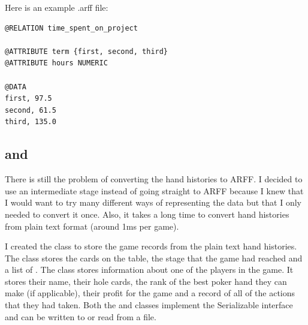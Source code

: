Here is an example .arff file:
\begin{verbatim}
@RELATION time_spent_on_project

@ATTRIBUTE term {first, second, third}
@ATTRIBUTE hours NUMERIC

@DATA
first, 97.5
second, 61.5
third, 135.0
\end{verbatim}


\subsection{\gr and \pr}							%


There is still the problem of converting the hand histories to ARFF. I decided to use an intermediate stage instead of going straight to ARFF because I knew that I would want to try many different ways of representing the data but that I only needed to convert it once. Also, it takes a long time to convert hand histories from plain text format (around 1ms per game).

I created the \gr class to store the game records from the plain text hand histories. The \gr class stores the cards on the table, the stage that the game had reached and a list of \prs. The \pr class stores information about one of the players in the game. It stores their name, their hole cards, the rank of the best poker hand they can make (if applicable), their profit for the game and a record of all of the actions that they had taken. Both the \gr and \pr classes implement the Serializable interface and can be written to or read from a file.

